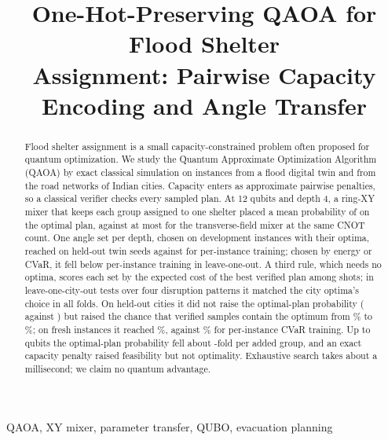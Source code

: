 \documentclass[conference]{IEEEtran}
\begin{document}
\title{One-Hot-Preserving QAOA for Flood Shelter\\
Assignment: Pairwise Capacity Encoding and Angle Transfer}

\author{
}

\maketitle

\begin{abstract}
Flood shelter assignment is a small capacity-constrained problem often proposed for quantum optimization. We study the Quantum Approximate Optimization Algorithm (QAOA) by exact classical simulation on instances from a flood digital twin and from the road networks of \CityNCities{} Indian cities. Capacity enters as approximate pairwise penalties, so a classical verifier checks every sampled plan. At 12 qubits and depth 4, a ring-XY mixer that keeps each group assigned to one shelter placed a mean probability of \SeedXYMean{} on the optimal plan, against at most \SeedXMax{} for the transverse-field mixer at the same CNOT count. One angle set per depth, chosen on development instances with their optima, reached \SelPopt{} on held-out twin seeds against \SelTrained{} for per-instance training; chosen by energy or CVaR, it fell below per-instance training in leave-one-out. A third rule, which needs no optima, scores each set by the expected cost of the best verified plan among \Shots{} shots; in leave-one-city-out tests over four disruption patterns it matched the city optima's choice in all \LcFolds{} folds. On held-out cities it did not raise the optimal-plan probability (\LcVOpt{} against \LcTrained) but raised the chance that \Shots{} verified samples contain the optimum from \LcTrainedSucc\% to \LcVSucc\%; on \FrN{} fresh instances it reached \FrSetSucc\%, against \FrCvarSucc\% for per-instance CVaR training. Up to \ScQubitsMax{} qubits the optimal-plan probability fell about \ScDecay-fold per added group, and an exact capacity penalty raised feasibility but not optimality. Exhaustive search takes about a millisecond; we claim no quantum advantage.
\end{abstract}

\begin{IEEEkeywords}
QAOA, XY mixer, parameter transfer, QUBO, evacuation planning
\end{IEEEkeywords}
\end{document}
